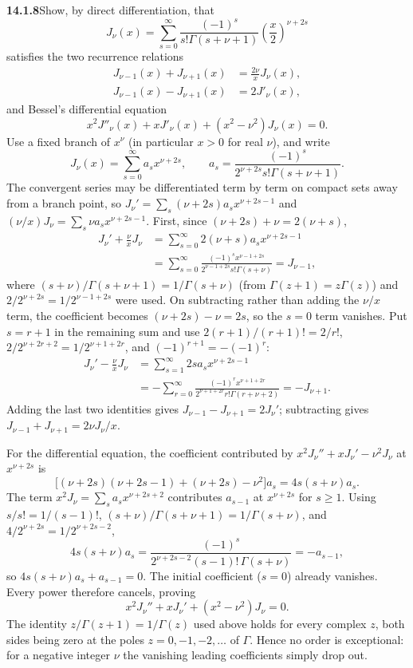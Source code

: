 \par\bigskip
\noindent\textbf{14.1.8}\quad Show, by direct differentiation, that
\[
J_{\nu}(x)=\sum_{s=0}^{\infty}\frac{(-1)^{s}}{s!\Gamma(s+\nu+1)}
\left(\frac{x}{2}\right)^{\nu+2s}
\]
satisfies the two recurrence relations
\begin{align*}
J_{\nu-1}(x)+J_{\nu+1}(x)&=\frac{2\nu}{x}J_{\nu}(x),\\
J_{\nu-1}(x)-J_{\nu+1}(x)&=2J'_{\nu}(x),
\end{align*}
and Bessel's differential equation
\[
x^{2}J''_{\nu}(x)+xJ'_{\nu}(x)+(x^{2}-\nu^{2})J_{\nu}(x)=0.
\]
\solution
Use a fixed branch of $x^\nu$ (in particular $x>0$ for real $\nu$),
and write
\[
J_\nu(x)=\sum_{s=0}^{\infty}a_s x^{\nu+2s},\qquad
a_s=\frac{(-1)^s}{2^{\nu+2s}s!\Gamma(s+\nu+1)}.
\]
The convergent series may be differentiated term by term on compact
sets away from a branch point, so
$J_\nu'=\sum_s(\nu+2s)a_sx^{\nu+2s-1}$ and
$(\nu/x)J_\nu=\sum_s\nu a_sx^{\nu+2s-1}$. First, since
$(\nu+2s)+\nu=2(\nu+s)$,
\begin{align*}
J_\nu'+\frac\nu{x}J_\nu
&=\sum_{s=0}^{\infty}2(\nu+s)a_sx^{\nu+2s-1}\\
&=\sum_{s=0}^{\infty}
\frac{(-1)^s x^{\nu-1+2s}}{2^{\nu-1+2s}s!\Gamma(s+\nu)}
=J_{\nu-1},
\end{align*}
where $(s+\nu)/\Gamma(s+\nu+1)=1/\Gamma(s+\nu)$ (from
$\Gamma(z+1)=z\Gamma(z)$) and $2/2^{\nu+2s}=1/2^{\nu-1+2s}$ were used.
On subtracting rather than adding the $\nu/x$ term, the coefficient
becomes $(\nu+2s)-\nu=2s$, so the $s=0$ term vanishes. Put $s=r+1$ in
the remaining sum and use $2(r+1)/(r+1)!=2/r!$,
$2/2^{\nu+2r+2}=1/2^{\nu+1+2r}$, and $(-1)^{r+1}=-(-1)^r$:
\begin{align*}
J_\nu'-\frac\nu{x}J_\nu
&=\sum_{s=1}^{\infty}2s a_sx^{\nu+2s-1}\\
&=-\sum_{r=0}^{\infty}
\frac{(-1)^r x^{\nu+1+2r}}{2^{\nu+1+2r}r!\Gamma(r+\nu+2)}
=-J_{\nu+1}.
\end{align*}
Adding the last two identities gives
$J_{\nu-1}-J_{\nu+1}=2J_\nu'$; subtracting gives
$J_{\nu-1}+J_{\nu+1}=2\nu J_\nu/x$.

For the differential equation, the coefficient contributed by
$x^2J_\nu''+xJ_\nu'-\nu^2J_\nu$ at $x^{\nu+2s}$ is
\[
\bigl[(\nu+2s)(\nu+2s-1)+(\nu+2s)-\nu^2\bigr]a_s
=4s(s+\nu)a_s.
\]
The term $x^2J_\nu=\sum_sa_sx^{\nu+2s+2}$ contributes $a_{s-1}$ at
$x^{\nu+2s}$ for $s\ge1$. Using $s/s!=1/(s-1)!$,
$(s+\nu)/\Gamma(s+\nu+1)=1/\Gamma(s+\nu)$, and
$4/2^{\nu+2s}=1/2^{\nu+2s-2}$,
\[
4s(s+\nu)a_s=\frac{(-1)^s}{2^{\nu+2s-2}(s-1)!\,\Gamma(s+\nu)}
=-a_{s-1},
\]
so $4s(s+\nu)a_s+a_{s-1}=0$. The initial coefficient ($s=0$)
already vanishes. Every power therefore cancels, proving
\[
\boxed{x^2J_\nu''+xJ_\nu'+(x^2-\nu^2)J_\nu=0.}
\]
The identity $z/\Gamma(z+1)=1/\Gamma(z)$ used above holds for every
complex $z$, both sides being zero at the poles $z=0,-1,-2,\ldots$
of $\Gamma$. Hence no order is exceptional: for a negative integer
$\nu$ the vanishing leading coefficients simply drop out.

